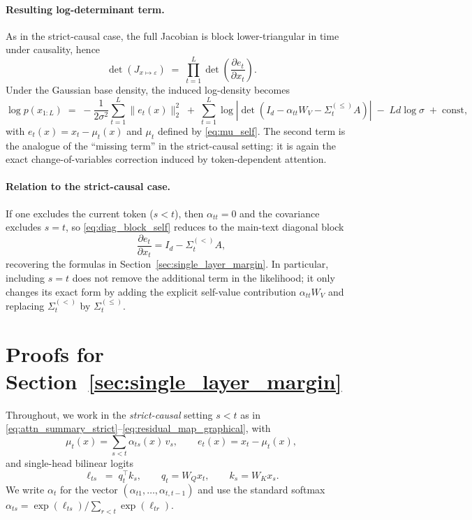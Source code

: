 \documentclass[11pt]{article}
\begin{document}
\paragraph{Resulting log-determinant term.}
As in the strict-causal case, the full Jacobian is block lower-triangular in time under causality, hence
\begin{equation}
\det\!\left(J_{x\mapsto \varepsilon}\right)
\;=\;
\prod_{t=1}^L
\det\!\left(\frac{\partial e_t}{\partial x_t}\right).
\label{eq:full_det_self}
\end{equation}
Under the Gaussian base density, the induced log-density becomes
\begin{equation}
\log p(x_{1:L})
\;=\;
-\frac{1}{2\sigma^2}\sum_{t=1}^L \|e_t(x)\|_2^2
\;+\;
\sum_{t=1}^L \log\left|\det\!\left(I_d-\alpha_{tt}W_V-\Sigma_t^{(\le)}A\right)\right|
\;-\;
Ld\log\sigma
\;+\;
\mathrm{const},
\label{eq:loglik_self}
\end{equation}
with $e_t(x)=x_t-\mu_t(x)$ and $\mu_t$ defined by \eqref{eq:mu_self}. The second term is the analogue of the ``missing term'' in the strict-causal setting: it is again the exact change-of-variables correction induced by token-dependent attention.

\paragraph{Relation to the strict-causal case.}
If one excludes the current token ($s<t$), then $\alpha_{tt}=0$ and the covariance excludes $s=t$, so \eqref{eq:diag_block_self} reduces to the main-text diagonal block
\[
\frac{\partial e_t}{\partial x_t}
=
I_d - \Sigma_t^{(<)}A,
\]
recovering the formulas in Section~\ref{sec:single_layer_margin}. In particular, including $s=t$ does not remove the additional term in the likelihood; it only changes its exact form by adding the explicit self-value contribution $\alpha_{tt}W_V$ and replacing $\Sigma_t^{(<)}$ by $\Sigma_t^{(\le)}$.



\section{Proofs for Section~\ref{sec:single_layer_margin}}
\label{app:proofs_single_layer}

Throughout, we work in the \emph{strict-causal} setting $s<t$ as in
\eqref{eq:attn_summary_strict}--\eqref{eq:residual_map_graphical}, with
\[
\mu_t(x)=\sum_{s<t}\alpha_{ts}(x)\,v_s,\qquad e_t(x)=x_t-\mu_t(x),
\]
and single-head bilinear logits
\[
\ell_{ts}\;=\; q_t^\top k_s,\qquad q_t=W_Q x_t,\qquad k_s=W_K x_s.
\]
We write $\alpha_t$ for the vector $(\alpha_{t1},\dots,\alpha_{t,t-1})$ and use the standard softmax
$\alpha_{ts}=\exp(\ell_{ts})/\sum_{r<t}\exp(\ell_{tr})$.
\end{document}
